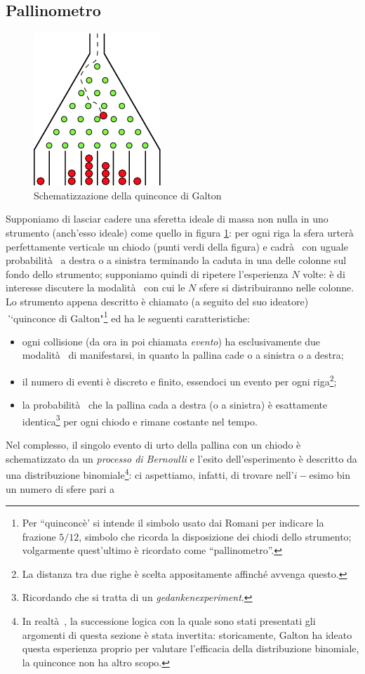 \documentclass[10pt,oneside,a4paper]{article}
\begin{document}
\subsection{Pallinometro}\label{sec:pallinometro}
\begin{figure}[h]
\centering
\includegraphics{pallinometro.png}
\caption{Schematizzazione della quinconce di Galton}
\label{fig:pallinometro}
\end{figure}
Supponiamo di lasciar cadere una sferetta ideale di massa non nulla in uno strumento (anch'esso ideale) come quello in figura \ref{fig:pallinometro}: per ogni riga la sfera urterà  perfettamente verticale un chiodo (punti verdi della figura) e cadrà  con uguale probabilità  a destra o a sinistra terminando la caduta in una delle colonne sul fondo dello strumento; supponiamo quindi di ripetere l'esperienza $N$ volte: è di interesse discutere la modalità  con cui le $N$ sfere si distribuiranno nelle colonne. Lo strumento appena descritto è chiamato (a seguito del suo ideatore) \emph ``quinconce di Galton"\footnote{Per ``quinconcè' si intende il simbolo usato dai Romani per indicare la frazione $5/12$, simbolo che ricorda la disposizione dei chiodi dello strumento; volgarmente quest'ultimo è ricordato come ``pallinometro''.} ed ha le seguenti caratteristiche:
\begin{itemize}
	\item ogni collisione (da ora in poi chiamata \emph{evento}) ha esclusivamente due modalità  di manifestarsi, in quanto la pallina cade o a sinistra o a destra;
	\item il numero di eventi è discreto e finito, essendoci un evento per ogni riga\footnote{La distanza tra due righe è scelta appositamente affinché avvenga questo.};
	\item la probabilità  che la pallina cada a destra (o a sinistra) è esattamente identica\footnote{Ricordando che si tratta di un \emph{gedankenexperiment}.} per ogni chiodo e rimane costante nel tempo.
\end{itemize} Nel complesso, il singolo evento di urto della pallina con un chiodo è schematizzato da un \emph{processo di Bernoulli} e l'esito dell'esperimento è descritto da una distribuzione binomiale\footnote{In realtà , la successione logica con la quale sono stati presentati gli argomenti di questa sezione è stata invertita: storicamente, Galton ha ideato questa esperienza proprio per valutare l'efficacia della distribuzione binomiale, la quinconce non ha altro scopo.}: ci aspettiamo, infatti, di trovare nell'$i-$esimo bin un numero di sfere pari a 
\end{document}
